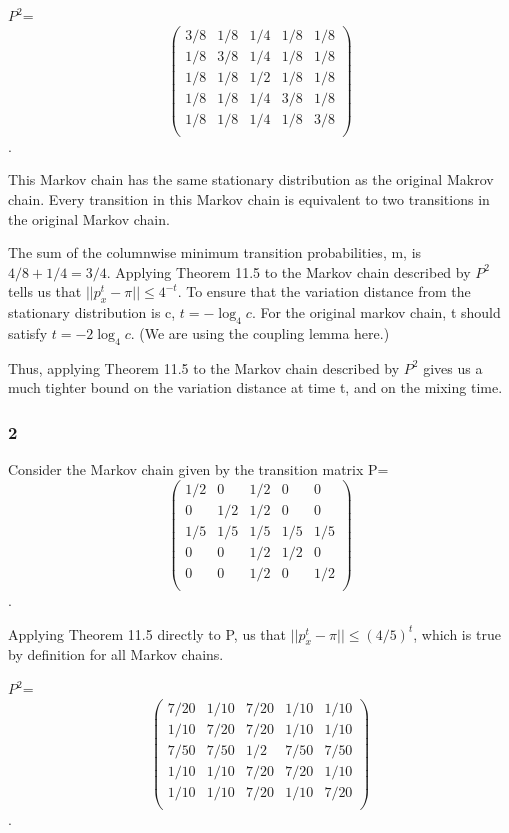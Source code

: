 \documentclass[10pt]{amsart}
\theoremstyle{remark}
\begin{document}
$P^{2}$=\[ \left( \begin{array}{ccccc}
3/8 & 1/8 & 1/4 & 1/8 & 1/8 \\
1/8 & 3/8 & 1/4 & 1/8 & 1/8 \\
1/8 & 1/8 & 1/2 & 1/8 & 1/8 \\
1/8 & 1/8 & 1/4 & 3/8 & 1/8 \\
1/8 & 1/8 & 1/4 & 1/8 & 3/8 \\
\end{array} \right)\].

This Markov chain has the same stationary distribution as the original Makrov chain. Every transition in this Markov chain is equivalent to two transitions in the original Markov chain.

The sum of the columnwise minimum transition probabilities, m, is $4/8+1/4=3/4$. Applying Theorem 11.5 to the Markov chain described by $P^{2}$ tells us that $||p_{x}^{t}-\pi|| \leq 4^{-t}$. To ensure that the variation distance from the stationary distribution is c, $t = -\log_{4}c$. For the original markov chain, t should satisfy $t = -2\log_{4}c$. (We are using the coupling lemma here.)

Thus, applying Theorem 11.5 to the Markov chain described by $P^{2}$ gives us a much tighter bound on the variation distance at time t, and on the mixing time.

\subsubsection{2} Consider the Markov chain given by the transition matrix
P=\[ \left( \begin{array}{ccccc}
1/2 & 0 & 1/2 & 0 & 0 \\
0 & 1/2 & 1/2 & 0 & 0 \\
1/5 & 1/5 & 1/5 & 1/5 & 1/5 \\
0 & 0 & 1/2 & 1/2 & 0 \\
0 & 0 & 1/2 & 0 & 1/2 \\
\end{array} \right)\].

Applying Theorem 11.5 directly to P, us that $||p_{x}^{t}-\pi|| \leq (4/5)^{t}$, which is true by definition for all Markov chains.

$P^{2}$=\[ \left( \begin{array}{ccccc}
7/20 & 1/10 & 7/20 & 1/10 & 1/10 \\
1/10 & 7/20 & 7/20 & 1/10 & 1/10 \\
7/50 & 7/50 & 1/2 & 7/50 & 7/50 \\
1/10 & 1/10 & 7/20 & 7/20 & 1/10 \\
1/10 & 1/10 & 7/20 & 1/10 & 7/20 \\
\end{array} \right)\].
\end{document}
